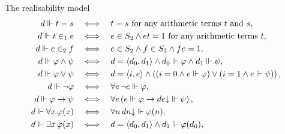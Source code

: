\documentclass{beamer}
\newcommand{\tuple}[1]{\left\langle #1 \right\rangle}
\begin{document}
\begin{frame}{The realisability model}
  \vspace{-1em}
  \begin{align*}
    d \Vdash t = s                                                  & \quad \Longleftrightarrow \quad t = s \text{ for any arithmetic terms $t$ and $s$},                                                                        \\
    d \Vdash t \in_1 e                                              & \quad \Longleftrightarrow \quad e \in S_2 \land et = 1 \text{ for any arithmetic terms $t$},                                                               \\
    d \Vdash e \in_2 f                                              & \quad \Longleftrightarrow \quad e \in S_2 \land f \in S_3 \land fe = 1,                                                                                    \\
    d \Vdash \varphi \land \psi                                     & \quad \Longleftrightarrow \quad d = \tuple{d_0, d_1} \land d_0 \Vdash \varphi \land d_1 \Vdash \psi,                                                       \\
    d \Vdash \varphi \lor \psi                                      & \quad \Longleftrightarrow \quad d = \tuple{i, e} \land \left(\left(i = 0 \land e \Vdash \varphi\right) \lor \left(i = 1 \land e \Vdash \psi\right)\right), \\
    d \Vdash \lnot \varphi                                          & \quad \Longleftrightarrow \quad \forall e \, \neg e \Vdash \varphi,                                                                                        \\
    d \Vdash \varphi \rightarrow \psi                               & \quad \Longleftrightarrow \quad \forall e \left(e \Vdash \varphi \rightarrow de {\downarrow} \Vdash \psi\right),                                           \\
    d \Vdash \forall x \, \varphi\mleft(x\mright)                   & \quad \Longleftrightarrow \quad \forall n \, dn {\downarrow} \Vdash \varphi\mleft(n\mright),                                                               \\
    d \Vdash \exists x \, \varphi\mleft(x\mright)                   & \quad \Longleftrightarrow \quad d = \tuple{d_0, d_1} \land d_1 \Vdash \varphi\mleft(d_0\mright),                                                           \\

\end{align*}
\end{frame}
\end{document}
